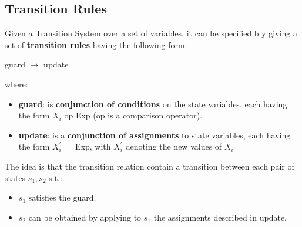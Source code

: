 \subsection{Transition Rules}
Given a Transition System over a set of variables, it can be specified b y giving a set of \textbf{transition rules} having the following form:
\begin{center}
    guard $\rightarrow$ update
\end{center}
where:
\begin{itemize}
    \item \textbf{guard}: is \textbf{conjunction of conditions} on the state variables, each having the form $X_i$ op Exp (op is a comparison operator).
    \item \textbf{update}: is a \textbf{conjunction of assignments} to state variables, each having the form $X^{'}_{i} = $ Exp, with $X^{'}_{i}$ denoting the new values of $X_i$ 
\end{itemize}

The idea is that the transition relation contain a transition between each pair of states $s_1, s_2$ s.t.:
\begin{itemize}
    \item $s_1$ satisfies the guard.
    \item  $s_2$ can be obtained by applying to $s_1$ the assignments described in update.
\end{itemize}